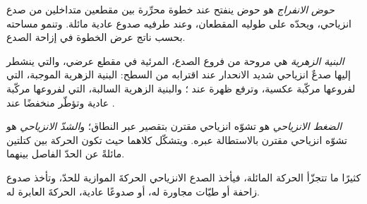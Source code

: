 \begin{definition}\label{def:b3:extension-strike-slip:pull-apart}
\emph{حوض الانفراج} هو حوض ينفتح عند خطوة محرِّرة بين
مقطعين متداخلين من صدع انزياحي، ويحدّه على طوليه المقطعان،
وعند طرفيه صدوع عادية مائلة. وتنمو مساحته بحسب ناتج عرض الخطوة
في إزاحة الصدع.
\end{definition}

\begin{definition}\label{def:b3:extension-strike-slip:flower}
\emph{البنية الزهرية} هي مروحة من فروع الصدع،
المرئية في مقطع عرضي، والتي ينشطر إليها صدعٌ انزياحي شديد الانحدار عند اقترابه
من السطح: البنية الزهرية الموجبة، التي لفروعها مركّبة عكسية،
وترفع ظهرة عند ؛ والبنية الزهرية السالبة، التي لفروعها
مركّبة عادية وتؤطّر منخفضًا عند .
\end{definition}

\begin{definition}\label{def:b3:extension-strike-slip:transpression}
\emph{الضغط الانزياحي} هو تشوّه انزياحي مقترن
بتقصير عبر النطاق؛ و\emph{الشدّ الانزياحي} هو
تشوّه انزياحي مقترن بالاستطالة عبره. ويتشكّل كلاهما حيث
تكون الحركة بين كتلتين مائلةً عن الحدّ الفاصل بينهما.
\end{definition}

كثيرًا ما تتجزّأ الحركة المائلة، فيأخذ الصدع الانزياحي الحركةَ الموازية
للحدّ، وتأخذ صدوع زاحفة أو طيّات مجاورة له، أو صدوعًا عادية،
الحركةَ العابرة له.

